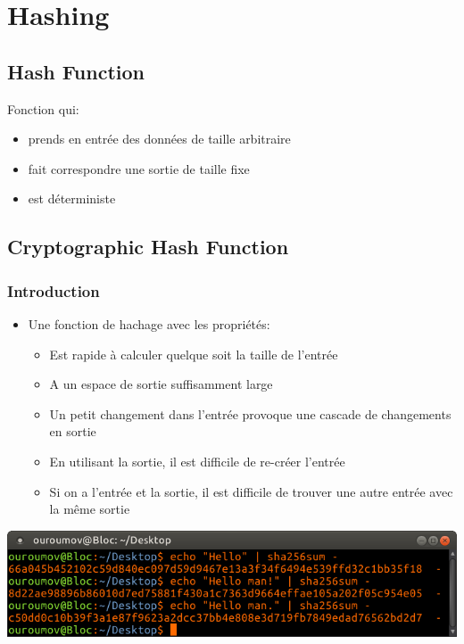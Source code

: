 \section{Hashing}

\subsection{Hash Function}

\begin{frame}


Fonction qui:
\begin{itemize}
    \item prends en entrée des données de taille arbitraire
    \item fait correspondre une sortie de taille fixe
    \item est déterministe
\end{itemize}

\begin{center}
\begin{minipage}[c]{0.7\linewidth}


\end{minipage}
\end{center}

\end{frame}





\subsection{Cryptographic Hash Function}
\begin{frame}
\frametitle{Introduction}
\begin{itemize}
    \item Une fonction de hachage avec les propriétés:
    \begin{itemize}
        \item Est rapide à calculer quelque soit la taille de l'entrée
        \item A un espace de sortie suffisamment large
        \item Un petit changement dans l'entrée provoque une cascade de changements en sortie
        \item En utilisant la sortie, il est difficile de re-créer l'entrée
        \item Si on a l'entrée et la sortie, il est difficile de trouver une autre entrée avec la même sortie
    \end{itemize}
\end{itemize}
\includegraphics[scale=.5]{res/sha256sum}
\end{frame}


